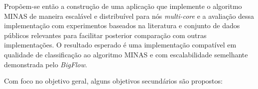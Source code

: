 % 

Propõem-se então a construção de uma aplicação que implemente o algoritmo MINAS
de maneira escalável e distribuível para nós \emph{multi-core} e a avaliação
dessa implementação com experimentos baseados na literatura e conjunto de dados
públicos relevantes para facilitar posterior comparação com outras
implementações.
O resultado esperado é uma implementação compatível em qualidade de
classificação ao algoritmo MINAS e com escalabilidade semelhante demonstrada pelo
\emph{BigFlow}.




Com foco no objetivo geral, alguns objetivos secundários são propostos:


